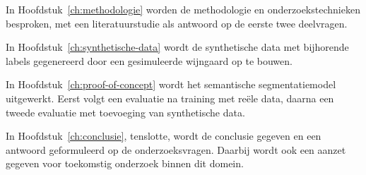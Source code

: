 In Hoofdstuk~\ref{ch:methodologie} worden de methodologie en onderzoekstechnieken besproken, met een literatuurstudie als antwoord op de eerste twee deelvragen.


In Hoofdstuk~\ref{ch:synthetische-data} wordt de synthetische data met bijhorende labels gegenereerd door een gesimuleerde wijngaard op te bouwen.

In Hoofdstuk~\ref{ch:proof-of-concept} wordt het semantische segmentatiemodel uitgewerkt. Eerst volgt een evaluatie na training met reële data, daarna een tweede evaluatie met toevoeging van synthetische data.

In Hoofdstuk~\ref{ch:conclusie}, tenslotte, wordt de conclusie gegeven en een antwoord geformuleerd op de onderzoeksvragen. Daarbij wordt ook een aanzet gegeven voor toekomstig onderzoek binnen dit domein.